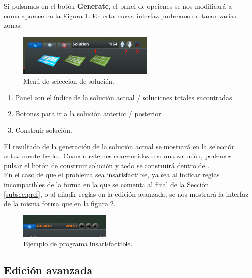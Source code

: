 Si pulsamos en el botón \textbf{Generate}, el panel de opciones se nos modificará a como aparece en la Figura \ref{fig:solutions}. En esta nueva interfaz podremos destacar varias zonas:

\begin{figure}[h]
	\centering
	\includegraphics[width=0.6\textwidth]{images/solutions}
	\caption{Menú de selección de solución.}
	\label{fig:solutions}
\end{figure}

\begin{enumerate}
    \item Panel con el índice de la solución actual / soluciones totales encontradas.
    \item Botones para ir a la solución anterior / posterior.
    \item Construir solución.
\end{enumerate}

El resultado de la generación de la solución actual se mostrará en la selección actualmente hecha. Cuando estemos convencidos con una solución, podemos pulsar el botón de construir solución y todo se construirá dentro de \cities. \\

En el caso de que el problema sea insatisfactible, ya sea al indicar reglas incompatibles de la forma en la que se comenta al final de la Sección \ref{subsec:pref}, o al añadir reglas en la edición avanzada; se nos mostrará la interfaz de la misma forma que en la figura \ref{fig:unsat-solution}.

\begin{figure}[h]
	\centering
	\includegraphics[width=0.4\textwidth]{images/unsat-solution}
	\caption{Ejemplo de programa insatisfactible.}
	\label{fig:unsat-solution}
\end{figure}

\subsection{Edición avanzada}
\label{subsec:logic-files}

